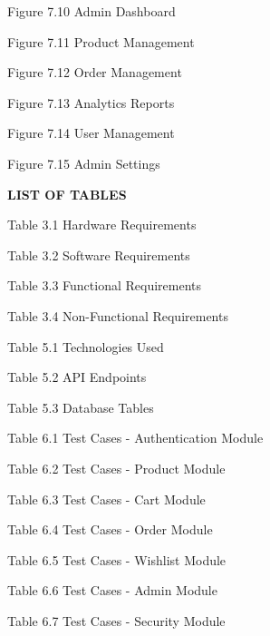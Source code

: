 \documentclass[12pt,a4paper]{report}
\begin{document}
\noindent Figure 7.10 \hspace{0.5em} Admin Dashboard 

\noindent Figure 7.11 \hspace{0.5em} Product Management 

\noindent Figure 7.12 \hspace{0.5em} Order Management 

\noindent Figure 7.13 \hspace{0.5em} Analytics Reports 

\noindent Figure 7.14 \hspace{0.5em} User Management 

\noindent Figure 7.15 \hspace{0.5em} Admin Settings 

\vspace{15pt}

\begin{center}
    \textbf{\Large LIST OF TABLES}
\end{center}

\vspace{10pt}

\noindent Table 3.1 \hspace{0.5em} Hardware Requirements 

\noindent Table 3.2 \hspace{0.5em} Software Requirements 

\noindent Table 3.3 \hspace{0.5em} Functional Requirements 

\noindent Table 3.4 \hspace{0.5em} Non-Functional Requirements 

\noindent Table 5.1 \hspace{0.5em} Technologies Used 

\noindent Table 5.2 \hspace{0.5em} API Endpoints 

\noindent Table 5.3 \hspace{0.5em} Database Tables 

\noindent Table 6.1 \hspace{0.5em} Test Cases - Authentication Module 

\noindent Table 6.2 \hspace{0.5em} Test Cases - Product Module 

\noindent Table 6.3 \hspace{0.5em} Test Cases - Cart Module 

\noindent Table 6.4 \hspace{0.5em} Test Cases - Order Module 

\noindent Table 6.5 \hspace{0.5em} Test Cases - Wishlist Module 

\noindent Table 6.6 \hspace{0.5em} Test Cases - Admin Module 

\noindent Table 6.7 \hspace{0.5em} Test Cases - Security Module 
\end{document}
